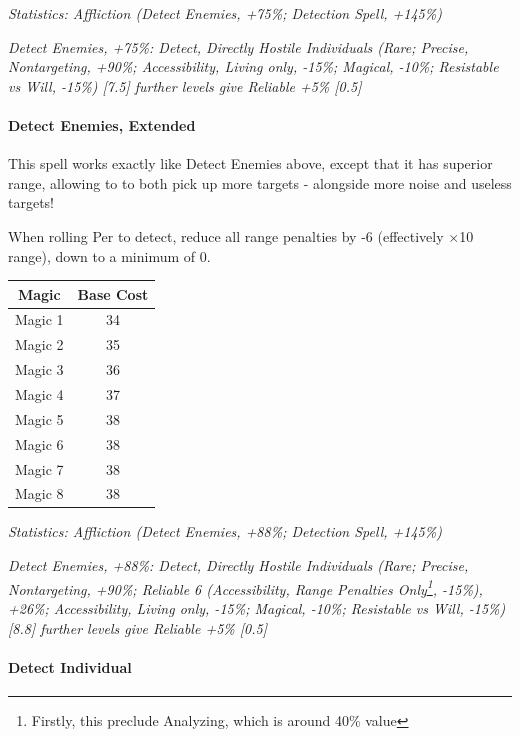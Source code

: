 \begin{multicols*}{3}
	\textcolor{OliveGreen}{\textit{ Statistics: Affliction (Detect Enemies, +75\%; Detection Spell, +145\%) }}
	
	\textcolor{OliveGreen}{\textit{Detect Enemies, +75\%: Detect, Directly Hostile Individuals (Rare; Precise, Nontargeting, +90\%; Accessibility, Living only, -15\%; Magical, -10\%; Resistable vs Will, -15\%) [7.5] further levels give Reliable +5\% [0.5]}}
	
	\paragraph{Detect Enemies, Extended}
	
	This spell works exactly like Detect Enemies above, except that it has superior range, allowing to to both pick up more targets - alongside more noise and useless targets!
	
	When rolling Per to detect, reduce all range penalties by -6 (effectively $\times$10 range), down to a minimum of 0.
	
	\begin{center}
		\begin{tabular}{|c|c|}
			\hline
			Magic & Base Cost \\
			\hline
			\hline
			Magic 1 & 34 \\
			Magic 2 & 35 \\
			Magic 3 & 36 \\
			Magic 4 & 37 \\
			Magic 5 & 38 \\
			Magic 6 & 38 \\
			Magic 7 & 38 \\
			Magic 8 & 38 \\
			\hline
		\end{tabular}
	\end{center} 
	
	\textcolor{OliveGreen}{\textit{ Statistics: Affliction (Detect Enemies, +88\%; Detection Spell, +145\%) }}
	
	\textcolor{OliveGreen}{\textit{Detect Enemies, +88\%: Detect, Directly Hostile Individuals (Rare; Precise, Nontargeting, +90\%; Reliable 6 (Accessibility, Range Penalties Only\footnote{Firstly, this preclude Analyzing, which is around 40\% value}, -15\%), +26\%; Accessibility, Living only, -15\%; Magical, -10\%; Resistable vs Will, -15\%) [8.8] further levels give Reliable +5\% [0.5]}}
	
	\paragraph{Detect Individual}
		

\end{multicols*}
